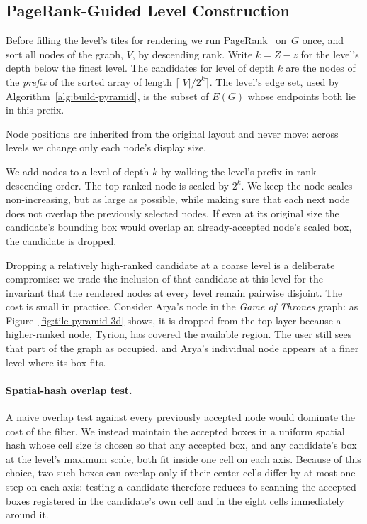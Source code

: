 \documentclass[a4paper,USenglish,anonymous]{gd-lipics-v3}
\begin{document}
\subsection{PageRank-Guided Level Construction}
\label{sec:filter}
Before filling the level's tiles for rendering we run
PageRank~\cite{page1999pagerank} on~$G$ once, and sort all nodes of
the graph, $V$, by descending rank. Write $k = Z - z$ for the
level's depth below the finest level. The candidates for level of
depth $k$ are the nodes of the \emph{prefix} of the sorted array of
length $\lceil |V|/2^k\rceil$. The level's edge set, used by
Algorithm~\ref{alg:build-pyramid}, is the subset of $E(G)$ whose
endpoints both lie in this prefix.

Node positions are inherited from the original layout and never move:
across levels we change only each node's display size. 

We add nodes to a level of depth $k$ by walking the level's prefix in
rank-descending order. The top-ranked node is scaled by $2^k$. We keep
the node scales non-increasing, but as large as possible, while
making sure that each next node does not overlap the previously
selected nodes. If even at its original size the candidate's bounding
box would overlap an already-accepted node's scaled box, the candidate
is dropped.

Dropping a relatively high-ranked candidate at a coarse level is a
deliberate compromise: we trade the inclusion of that candidate at
this level for the invariant that the rendered nodes at every level
remain pairwise disjoint. The cost is small in practice. Consider
Arya's node in the \emph{Game of Thrones} graph: as
Figure~\ref{fig:tile-pyramid-3d} shows, it is dropped from the top
layer because a higher-ranked node, Tyrion, has covered the available
region. The user still sees that part of the graph as occupied, and
Arya's individual node appears at a finer level where its box fits.

\paragraph{Spatial-hash overlap test.}
A naive overlap test against every previously accepted node would
dominate the cost of the filter. We instead maintain the accepted
boxes in a uniform spatial hash whose cell size is chosen so that any
accepted box, and any candidate's box at the level's maximum scale,
both fit inside one cell on each axis. Because of this choice, two
such boxes can overlap only if their center cells differ by at most
one step on each axis: testing a candidate therefore reduces to
scanning the accepted boxes registered in the candidate's own cell and
in the eight cells immediately around it.
\end{document}
